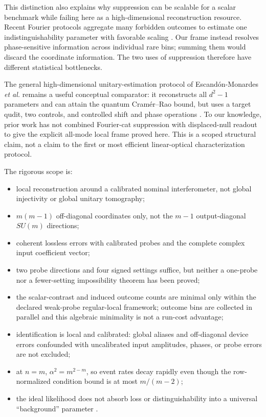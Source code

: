 \documentclass[aps,pra,reprint,amsmath,amssymb,superscriptaddress,longbibliography]{revtex4-2}
\begin{document}
This distinction also explains why suppression can be scalable for a scalar
benchmark while failing here as a high-dimensional reconstruction resource.
Recent Fourier protocols aggregate many forbidden outcomes to estimate one
indistinguishability parameter with favorable scaling \cite{Sanz2026}.  Our
frame instead resolves phase-sensitive information across individual rare
bins; summing them would discard the coordinate information.  The two uses
of suppression therefore have different statistical bottlenecks.

The general high-dimensional unitary-estimation protocol of
Escand\'on-Monardes \emph{et al.} remains a useful conceptual comparator: it
reconstructs all $d^2-1$ parameters and can attain the quantum
Cramér--Rao bound, but uses a target qudit, two controls, and controlled
shift and phase operations \cite{EscandonMonardes2024}.  To our knowledge,
prior work has not combined Fourier-cat suppression with displaced-null
readout to give the explicit all-mode local frame proved here.  This is a
scoped structural claim, not a claim to the first or most efficient
linear-optical characterization protocol.

The rigorous scope is:
\begin{itemize}
\item local reconstruction around a calibrated nominal interferometer, not
global injectivity or global unitary tomography;
\item $m(m-1)$ off-diagonal coordinates only, not the $m-1$
output-diagonal $SU(m)$ directions;
\item coherent lossless errors with calibrated probes and the complete
complex input coefficient vector;
\item two probe directions and four signed settings suffice, but neither a
one-probe nor a fewer-setting impossibility theorem has been proved;
\item the scalar-contrast and induced outcome counts are minimal only within
the declared weak-probe regular-local framework; outcome bins are collected
in parallel and this algebraic minimality is not a run-cost advantage;
\item identification is local and calibrated: global aliases and
off-diagonal device errors confounded with uncalibrated input amplitudes,
phases, or probe errors are not excluded;
\item at $n=m$, $\alpha^2=m^{2-m}$, so event rates decay rapidly even
though the row-normalized condition bound is at most $m/(m-2)$;
\item the ideal likelihood does not absorb loss or distinguishability into
a universal ``background'' parameter
\cite{Shchesnovich2015,DufourBuchleitner2026}.
\end{itemize}
\end{document}
